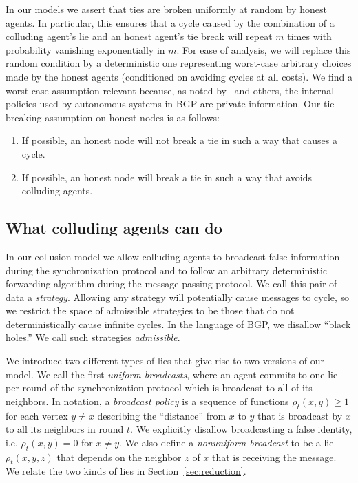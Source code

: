 \documentclass[prodmode,acmec]{ec-acmsmall}
\begin{document}
In our models we assert that ties are broken uniformly at random by honest
agents. In particular, this ensures that a cycle caused by the combination of a
colluding agent's lie and an honest agent's tie break will repeat $m$ times
with probability vanishing exponentially in $m$. For ease of analysis, we will
replace this random condition by a deterministic one representing worst-case
arbitrary choices made by the honest agents (conditioned on avoiding cycles at
all costs). We find a worst-case assumption relevant because, as noted
by~\cite{GoldbergSHR10} and others, the internal policies used by autonomous
systems in BGP are private information. Our tie breaking assumption on honest
nodes is as follows: 

\begin{enumerate}
   \item If possible, an honest node will not break a tie in such a way that
causes a cycle.
   \item If possible, an honest node will break a tie in such a way that avoids
colluding agents.
\end{enumerate}

\subsection{What colluding agents can do}
\label{sec:uniform-nonuniform-models}

In our collusion model we allow colluding agents to broadcast false information
during the synchronization protocol and to follow an arbitrary deterministic
forwarding algorithm during the message passing protocol. We call this pair of
data a \emph{strategy}. Allowing any strategy will potentially cause messages
to cycle, so we restrict the space of admissible strategies to be those that do
not deterministically cause infinite cycles. In the language of BGP, we
disallow ``black holes.'' We call such strategies \emph{admissible}.

We introduce two different types of lies that give rise to two versions of our
model. We call the first \emph{uniform broadcasts}, where an agent commits to
one lie per round of the synchronization protocol which is broadcast to all of
its neighbors. In notation, a \emph{broadcast policy} is a sequence of
functions $\rho_t(x,y) \geq 1$ for each vertex $y \neq x$ describing the
``distance'' from $x$ to $y$ that is broadcast by $x$ to all its neighbors in
round $t$. We explicitly disallow broadcasting a false identity, i.e.
$\rho_t(x,y) = 0$ for $x \neq y$. We also define a \emph{nonuniform broadcast}
to be a lie $\rho_t(x,y,z)$ that depends on the neighbor $z$ of $x$ that is
receiving the message. We relate the two kinds of lies in
Section~\ref{sec:reduction}.
\end{document}
